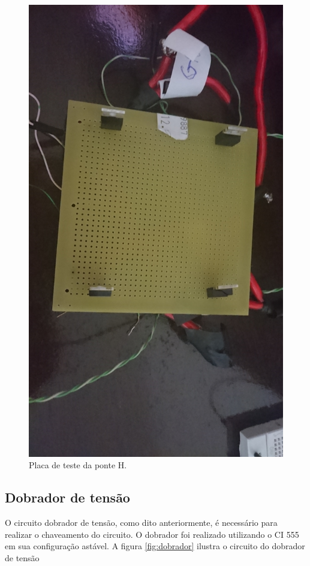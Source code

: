 \begin{figure}[h!]
  \centering
  \includegraphics[scale=0.075]{figuras/TestePonteH.JPG}
  \caption{Placa de teste da ponte H.}
\end{figure}

\subsection{Dobrador de tensão}

O circuito dobrador de tensão, como dito anteriormente, é necessário para
realizar o chaveamento do circuito. O dobrador foi realizado utilizando o CI
555 em sua configuração astável. A figura \ref{fig:dobrador} ilustra o circuito do dobrador de tensão

